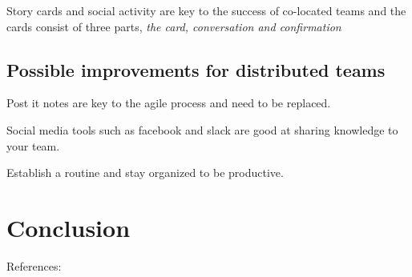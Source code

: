 \documentclass{scrartcl}
\begin{document}
Story cards and social activity are key to the success of co-located teams\cite{abdullah2011} and the cards consist of three parts, \textit{the card, conversation and confirmation} \cite{abdullah2011}


\subsection{Possible improvements for distributed teams}

Post it notes are key to the agile process and need to be replaced.

Social media tools such as facebook and slack are good at sharing knowledge to your team.

 Establish a routine and stay organized to be productive.

\section{Conclusion}


References:
\cite{bhalerao2010}
\cite{scharff2012}
\cite{abdullah2011}
\cite{joshi2013}
\cite{krasteva2008}
\cite{williams2012}
\cite{marjaie2011}
\cite{kumar2015}



\end{document}
